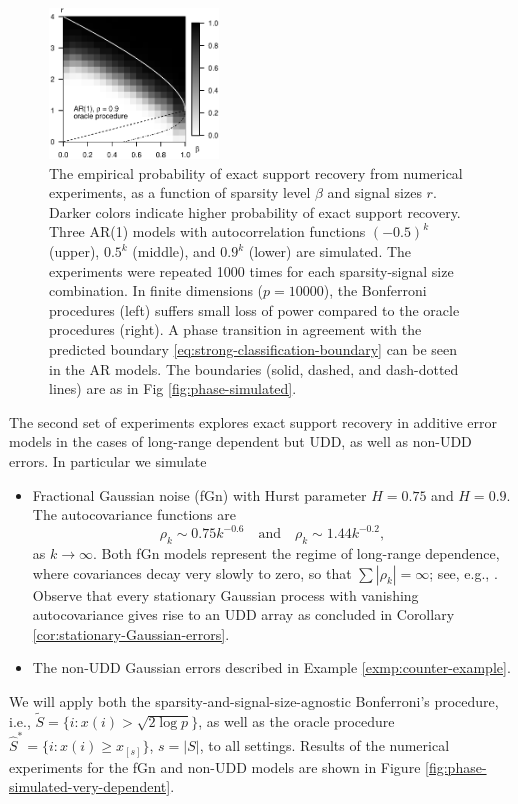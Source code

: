 \begin{figure}
    \includegraphics[width=0.4\textwidth]{./figures/simulated_boundaries/simulated_phase_diagram_AR09_p10000_oracle.eps}
    \caption{The empirical probability of exact support recovery from numerical experiments, as a function of sparsity level $\beta$ and signal sizes $r$. Darker colors indicate higher probability of exact support recovery. 
    Three AR(1) models with autocorrelation functions $(-0.5)^k$ (upper), 
    $0.5^k$ (middle), and $0.9^k$ (lower) are simulated.
    The experiments were repeated 1000 times for each sparsity-signal size combination.
    In finite dimensions ($p=10000$), the Bonferroni procedures (left) suffers small loss of power compared to the oracle procedures (right).
    A phase transition in agreement with the predicted boundary \eqref{eq:strong-classification-boundary} can be seen in the AR models.
    The boundaries (solid, dashed, and dash-dotted lines) are as in Fig \ref{fig:phase-simulated}.}
    \label{fig:phase-simulated-dependent}
\end{figure}

\medskip

The second set of experiments explores exact support recovery in additive error models in the cases of long-range dependent but UDD, as well as non-UDD errors.
In particular we simulate
\begin{itemize}
    \item Fractional Gaussian noise (fGn) with Hurst parameter $H = 0.75$ and $H = 0.9$. 
    The autocovariance functions are 
    $$\rho_{k} \sim 0.75k^{-0.6} \quad \text{and} \quad \rho_{k} \sim 1.44k^{-0.2},$$
    as $k\to\infty$.
    Both fGn models represent the regime of long-range dependence, where covariances decay very slowly to zero, so that $\sum|\rho_k| = \infty$; see, e.g., \citep{taqqu2003livre}.
    Observe that every stationary Gaussian process with vanishing autocovariance gives rise to an UDD array as concluded in Corollary \ref{cor:stationary-Gaussian-errors}.
    \item The non-UDD Gaussian errors described in Example \ref{exmp:counter-example}.
\end{itemize}
We will apply both the sparsity-and-signal-size-agnostic Bonferroni's procedure, i.e., $\widetilde{S} = \{i:x(i)>\sqrt{2\log{p}}\}$, as well as the oracle procedure $\widehat{S}^* = \{i:x(i)\ge x_{[s]}\}$, $s=|S|$, to all settings.
Results of the numerical experiments for the fGn and non-UDD models are shown in Figure \ref{fig:phase-simulated-very-dependent}.


